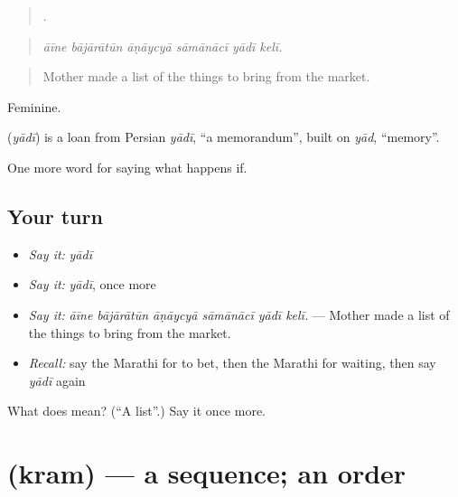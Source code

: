 \begin{quote}
     .
\end{quote}

\begin{quote}
\emph{āīne bājārātūn āṇāycyā sāmānācī yādī kelī.}
\end{quote}

\begin{quote}
Mother made a list of the things to bring from the market.
\end{quote}

Feminine.

\begin{cousinweb}
\textbf{} (\emph{yādī}) is a loan from Persian \emph{yādī}, \textquotedblleft{}a memorandum\textquotedblright{}, built on \emph{yād}, \textquotedblleft{}memory\textquotedblright{}.
\end{cousinweb}

\begin{grammarlens}[title={What you've built}]
One more word for saying what happens if.
\end{grammarlens}

\subsection*{Your turn}
\begin{itemize}
\raggedright
  \item \emph{Say it:} \emph{yādī}
  \item \emph{Say it:} \emph{yādī}, once more
  \item \emph{Say it:} \emph{āīne bājārātūn āṇāycyā sāmānācī yādī kelī.} — Mother made a list of the things to bring from the market.
  \item \emph{Recall:} say the Marathi for to bet, then the Marathi for waiting, then say \emph{yādī} again
\end{itemize}

\begin{tcolorbox}[breakable,colback=teal!4,colframe=teal!35!black,title={Before you move on}]
What does  mean? (\textquotedblleft{}A list\textquotedblright{}.) Say it once more.
\end{tcolorbox}
\section[\texorpdfstring{\mr{क्रम} (kram)}{क्रम (kram)}]{ (kram) — a sequence; an order}

